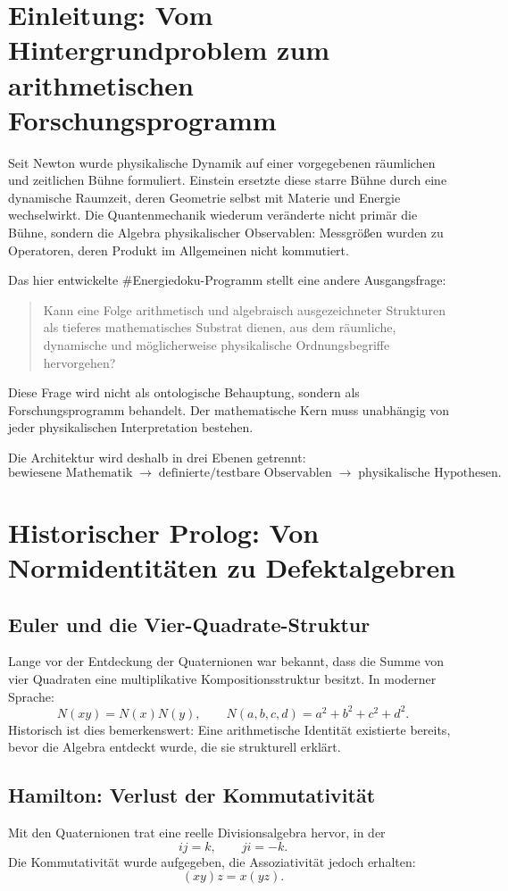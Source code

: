 \documentclass[11pt,a4paper]{article}
\begin{document}
\section{Einleitung: Vom Hintergrundproblem zum arithmetischen Forschungsprogramm}
Seit Newton wurde physikalische Dynamik auf einer vorgegebenen räumlichen und zeitlichen Bühne formuliert. Einstein ersetzte diese starre Bühne durch eine dynamische Raumzeit, deren Geometrie selbst mit Materie und Energie wechselwirkt. Die Quantenmechanik wiederum veränderte nicht primär die Bühne, sondern die Algebra physikalischer Observablen: Messgrößen wurden zu Operatoren, deren Produkt im Allgemeinen nicht kommutiert.

Das hier entwickelte \#Energiedoku-Programm stellt eine andere Ausgangsfrage:
\begin{quote}
Kann eine Folge arithmetisch und algebraisch ausgezeichneter Strukturen als tieferes mathematisches Substrat dienen, aus dem räumliche, dynamische und möglicherweise physikalische Ordnungsbegriffe hervorgehen?
\end{quote}
Diese Frage wird nicht als ontologische Behauptung, sondern als Forschungsprogramm behandelt. Der mathematische Kern muss unabhängig von jeder physikalischen Interpretation bestehen.

Die Architektur wird deshalb in drei Ebenen getrennt:
\[
\boxed{\text{bewiesene Mathematik}\;\longrightarrow\;\text{definierte/testbare Observablen}\;\longrightarrow\;\text{physikalische Hypothesen}.}
\]

\section{Historischer Prolog: Von Normidentitäten zu Defektalgebren}
\subsection{Euler und die Vier-Quadrate-Struktur}
Lange vor der Entdeckung der Quaternionen war bekannt, dass die Summe von vier Quadraten eine multiplikative Kompositionsstruktur besitzt. In moderner Sprache:
\[
N(xy)=N(x)N(y),\qquad N(a,b,c,d)=a^2+b^2+c^2+d^2.
\]
Historisch ist dies bemerkenswert: Eine arithmetische Identität existierte bereits, bevor die Algebra entdeckt wurde, die sie strukturell erklärt.

\subsection{Hamilton: Verlust der Kommutativität}
Mit den Quaternionen trat eine reelle Divisionsalgebra hervor, in der
\[
ij=k,\qquad ji=-k.
\]
Die Kommutativität wurde aufgegeben, die Assoziativität jedoch erhalten:
\[
(xy)z=x(yz).
\]
\end{document}
